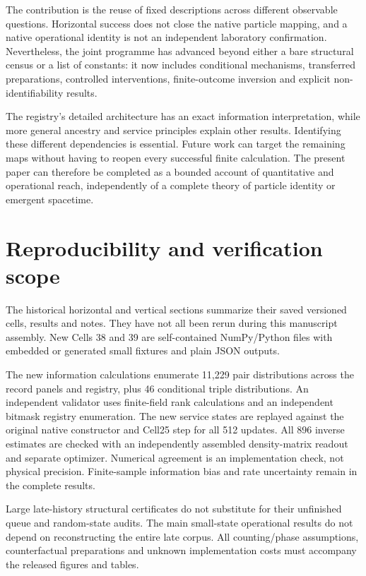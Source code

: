 \documentclass[11pt,a4paper]{article}
\begin{document}
The contribution is the reuse of fixed descriptions across different observable questions. Horizontal success does not close the native particle mapping, and a native operational identity is not an independent laboratory confirmation. Nevertheless, the joint programme has advanced beyond either a bare structural census or a list of constants: it now includes conditional mechanisms, transferred preparations, controlled interventions, finite-outcome inversion and explicit non-identifiability results.

The registry's detailed architecture has an exact information interpretation, while more general ancestry and service principles explain other results. Identifying these different dependencies is essential. Future work can target the remaining maps without having to reopen every successful finite calculation. The present paper can therefore be completed as a bounded account of quantitative and operational reach, independently of a complete theory of particle identity or emergent spacetime.

\section{Reproducibility and verification scope}\label{reproducibility-and-verification-scope}

The historical horizontal and vertical sections summarize their saved versioned cells, results and notes. They have not all been rerun during this manuscript assembly. New Cells 38 and 39 are self-contained NumPy/Python files with embedded or generated small fixtures and plain JSON outputs.

The new information calculations enumerate 11,229 pair distributions across the record panels and registry, plus 46 conditional triple distributions. An independent validator uses finite-field rank calculations and an independent bitmask registry enumeration. The new service states are replayed against the original native constructor and Cell25 step for all 512 updates. All 896 inverse estimates are checked with an independently assembled density-matrix readout and separate optimizer. Numerical agreement is an implementation check, not physical precision. Finite-sample information bias and rate uncertainty remain in the complete results.

Large late-history structural certificates do not substitute for their unfinished queue and random-state audits. The main small-state operational results do not depend on reconstructing the entire late corpus. All counting/phase assumptions, counterfactual preparations and unknown implementation costs must accompany the released figures and tables.
\end{document}
